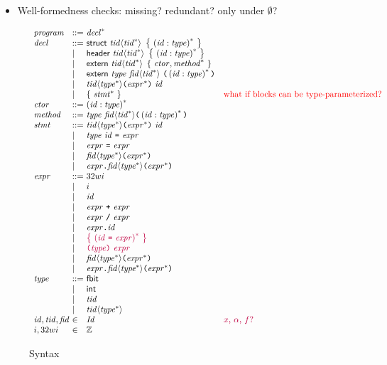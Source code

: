 \documentclass{article}
\newcommand{\inred}{\color{red}}
\newcommand{\ryu}{\color{purple}}
\newcommand{\embox}[1]{\mbox{\emph{#1}}}
\newcommand{\prths}[1]{\left(#1\right)}
\newcommand{\braces}[1]{\left\{\ #1\ \right\}}
\newcommand{\nprog}{\embox{program}}
\newcommand{\ndecl}{\embox{decl}}
\newcommand{\nstmt}{\embox{stmt}}
\newcommand{\nexpr}{\embox{expr}}
\newcommand{\ntype}{\embox{type}}
\newcommand{\ntid}{\embox{tid}}
\newcommand{\nid}{\embox{id}}
\newcommand{\nId}{\embox{Id}}
\newcommand{\nfid}{\embox{fid}}
\newcommand{\nctor}{\embox{ctor}}
\newcommand{\nmethod}{\embox{method}}
\newcommand{\tstruct}{\mathsf{struct}}
\newcommand{\theader}{\mathsf{header}}
\newcommand{\textern}{\mathsf{extern}}
\newcommand{\tfbit}{\mathsf{fbit}}
\newcommand{\tint}{\mathsf{int}}
\newcommand{\topenp}{\mbox{\texttt(}}
\newcommand{\tclosep}{\mbox{\texttt)}}
\newcommand{\topena}{\langle}
\newcommand{\tclosea}{\rangle}
\newcommand{\teq}{\mbox{\texttt=}}
\newcommand{\tdot}{\mbox{\texttt.}}
\newcommand{\tplus}{\mbox{\texttt+}}
\newcommand{\tdiv}{\mbox{\texttt/}}
\begin{document}
\begin{itemize}
\item Well-formedness checks: missing? redundant? only under $\emptyset$?
\end{itemize}

\renewcommand{\arraystretch}{1.2}
\begin{figure}[h]
\[
\begin{array}{l@{~}l@{~}ll}
\nprog & ::= & \ndecl^*\\
\ndecl & ::= & \tstruct\ \ntid \topena \ntid^* \tclosea\ \braces{\prths{\nid : \ntype}^*}\\
& \mid & \theader\ \ntid \topena \ntid^* \tclosea\ \braces{\prths{\nid : \ntype}^*}\\
& \mid & \textern\ \ntid \topena \ntid^* \tclosea\ \braces{\nctor, \nmethod^*}\\
& \mid & \textern\ \ntype\ \nfid \topena \ntid^* \tclosea\ \topenp \prths{\nid : \ntype}^* \tclosep\\
& \mid & \ntid \topena \ntype^* \tclosea \topenp \nexpr^*\tclosep\ \nid \\
& \mid & \braces{\nstmt^*} & \mbox{\inred what if blocks can be type-parameterized?}\\
\nctor & ::= & \prths{\nid: \ntype}^*\\
\nmethod & ::= & \ntype\ \nfid \topena \ntid^* \tclosea \topenp\prths{\nid: \ntype}^*\tclosep\\
\nstmt & ::= & \ntid \topena \ntype^* \tclosea \topenp \nexpr^* \tclosep\ \nid\\
& \mid & \ntype\ \nid\ \teq\ \nexpr\\
& \mid & \nexpr\ \teq\ \nexpr\\
& \mid & \nfid \topena \ntype^* \tclosea \topenp \nexpr^* \tclosep\\
& \mid & \nexpr \tdot \nfid \topena \ntype^* \tclosea \topenp \nexpr^* \tclosep\\
\nexpr & ::= & 32wi\\
& \mid & i\\
& \mid & \nid\\
& \mid & \nexpr\ \tplus\ \nexpr\\
& \mid & \nexpr\ \tdiv\ \nexpr\\
& \mid & \nexpr \tdot \nid\\
& \mid & {\ryu\braces{\prths{\nid\ \teq\ \nexpr}^*}}\\
& \mid & {\ryu\topenp \ntype \tclosep\ \nexpr}\\
& \mid & \nfid \topena \ntype^* \tclosea \topenp \nexpr^* \tclosep\\
& \mid & \nexpr \tdot \nfid \topena \ntype^* \tclosea \topenp \nexpr^* \tclosep\\
\ntype & ::= & \tfbit\\
& \mid & \tint\\
& \mid & \ntid\\
& \mid & \ntid \topena \ntype^* \tclosea\\
\nid, \ntid, \nfid & \in & \nId & \mbox{\ryu $x$, $\alpha$, $f$?}\\
i, 32wi & \in & \mathbb{Z}
\end{array}
\]
\caption{Syntax}
\label{fig:syntax}
\end{figure}
\end{document}
